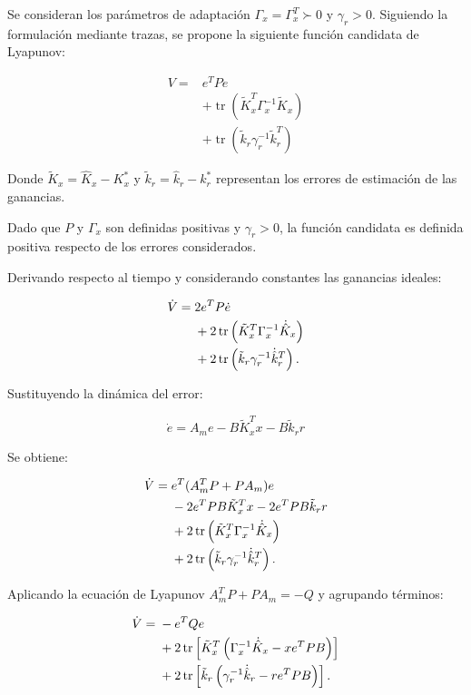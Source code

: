 \documentclass[conference,letterpaper]{IEEEtran}
\begin{document}
Se consideran los parámetros de adaptación
$\Gamma_x=\Gamma_x^T\succ0$ y $\gamma_r>0$.
Siguiendo la formulación mediante trazas,
se propone la siguiente función candidata de Lyapunov:

\begin{equation}\label{eq:V}
\boxed{
\begin{aligned}
V={}&e^TPe\\
&+\operatorname{tr}\left(
\tilde K_x^T\Gamma_x^{-1}\tilde K_x
\right)\\
&+\operatorname{tr}\left(
\tilde k_r\gamma_r^{-1}\tilde k_r^T
\right)
\end{aligned}
}
\end{equation}

Donde $\tilde K_x=\hat K_x-K_x^*$ y
$\tilde k_r=\hat k_r-k_r^*$ representan los errores
de estimación de las ganancias.

Dado que $P$ y $\Gamma_x$ son definidas positivas
y $\gamma_r>0$, la función candidata es
definida positiva respecto de los errores considerados.

Derivando respecto al tiempo y considerando constantes
las ganancias ideales:

\begin{align}
\dot V={}&2e^TP\dot e \notag\\
&+2\operatorname{tr}\left(
\tilde K_x^T\Gamma_x^{-1}\dot{\hat K}_x
\right)\notag\\
&+2\operatorname{tr}\left(
\tilde k_r\gamma_r^{-1}\dot{\hat k}_r^T
\right).
\end{align}

Sustituyendo la dinámica del error:

\begin{equation}
\dot e=A_me-B\tilde K_x^Tx-B\tilde k_r r
\end{equation}

Se obtiene:

\begin{align}
\dot V={}&e^T(A_m^TP+PA_m)e\notag\\
&-2e^TPB\tilde K_x^Tx
-2e^TPB\tilde k_r r\notag\\
&+2\operatorname{tr}\left(
\tilde K_x^T\Gamma_x^{-1}\dot{\hat K}_x
\right)\notag\\
&+2\operatorname{tr}\left(
\tilde k_r\gamma_r^{-1}\dot{\hat k}_r^T
\right).
\end{align}

Aplicando la ecuación de Lyapunov
$A_m^TP+PA_m=-Q$ y agrupando términos:

\begin{align}
\dot V={}&-e^TQe\notag\\
&+2\operatorname{tr}\left[
\tilde K_x^T
\left(
\Gamma_x^{-1}\dot{\hat K}_x-xe^TPB
\right)
\right]\notag\\
&+2\operatorname{tr}\left[
\tilde k_r
\left(
\gamma_r^{-1}\dot{\hat k}_r-re^TPB
\right)
\right].
\end{align}
\end{document}
